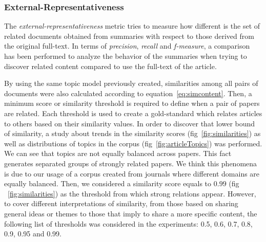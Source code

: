 \subsubsection{External-Representativeness}  

The \textit{external-representativeness} metric tries to measure how different is the set of related documents obtained from summaries with respect to those derived from the original full-text. In terms of \textit{precision}, \textit{recall} and \textit{f-measure}, a comparison has been performed to analyze the behavior of the summaries when trying to discover related content compared to use the full-text of the article.

By using the same topic model previously created, similarities among all pairs of documents were also calculated according to equation~\ref{eq:simcontent}. Then, a minimum score or similarity threshold is required to define when a pair of papers are related. Each threshold is used to create a gold-standard which relates articles to others based on their similarity values. In order to discover that lower bound of similarity, a study about trends in the similarity scores (fig~\ref{fig:similarities}) as well as distributions of topics in the corpus (fig~\ref{fig:articleTopics}) was performed. We can see that topics are not equally balanced across papers. This fact generates separated groups of strongly related papers. We think this phenomena is due to our usage of a corpus created from journals where different domains are equally balanced. Then, we considered a similarity score equals to $0.99$ (fig ~\ref{fig:similarities}) as the threshold from which strong relations appear. However, to cover different interpretations of similarity, from those based on sharing general ideas or themes to those that imply to share a more specific content, the following list of thresholds was considered in the experiments: 0.5, 0.6, 0.7, 0.8, 0.9, 0.95 and 0.99.

